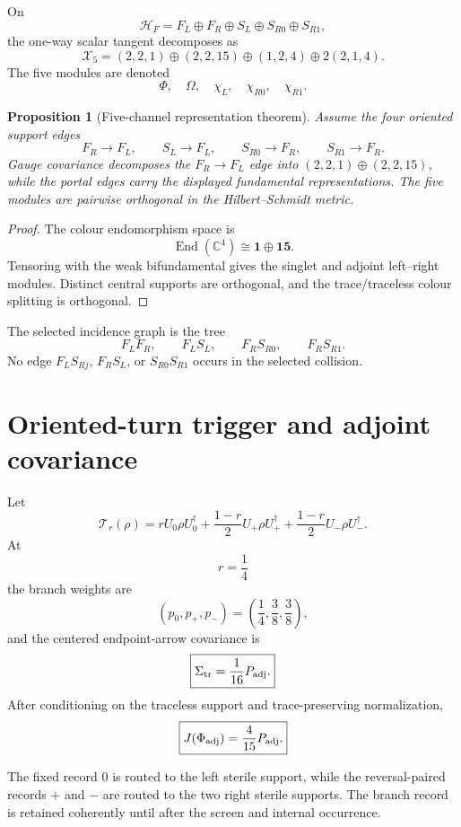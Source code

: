 \documentclass[11pt,oneside,openany]{book}
\numberwithin{equation}{chapter}
\newtheorem{proposition}[theorem]{Proposition}
\theoremstyle{definition}
\theoremstyle{remark}
\newcommand{\C}{\mathbb C}
\newcommand{\End}{\operatorname{End}}
\begin{document}
On
\[
 \mathcal H_F
 =
 F_L\oplus F_R\oplus S_L\oplus S_{R0}\oplus S_{R1},
\]
the one-way scalar tangent decomposes as
\[
 \boxed{
 \mathcal X_5
 =
 (2,2,1)
 \oplus
 (2,2,15)
 \oplus
 (1,2,4)
 \oplus
 2(2,1,4).}
\]
The five modules are denoted
\[
 \Phi,\quad\Omega,\quad\chi_L,\quad\chi_{R0},\quad\chi_{R1}.
\]

\begin{proposition}[Five-channel representation theorem]
\label{prop:five-channel-decomp}
Assume the four oriented support edges
\[
 F_R\to F_L,\qquad
 S_L\to F_L,\qquad
 S_{R0}\to F_R,\qquad
 S_{R1}\to F_R.
\]
Gauge covariance decomposes the \(F_R\to F_L\) edge into
\((2,2,1)\oplus(2,2,15)\), while the portal edges carry the displayed
fundamental representations.  The five modules are pairwise orthogonal in
the Hilbert--Schmidt metric.
\end{proposition}

\begin{proof}
The colour endomorphism space is
\[
 \End(\C^4)\cong\mathbf1\oplus\mathbf{15}.
\]
Tensoring with the weak bifundamental gives the singlet and adjoint
left--right modules.  Distinct central supports are orthogonal, and the
trace/traceless colour splitting is orthogonal.
\end{proof}

The selected incidence graph is the tree
\[
 \boxed{
 F_LF_R,\qquad
 F_LS_L,\qquad
 F_RS_{R0},\qquad
 F_RS_{R1}.}
 \label{eq:selected-five-tree}
\]
No edge \(F_LS_{Rj}\), \(F_RS_L\), or \(S_{R0}S_{R1}\) occurs in the selected
collision.

\section{Oriented-turn trigger and adjoint covariance}

Let
\[
 \mathcal T_r(\rho)
 =
 rU_0\rho U_0^\dagger
 +
 \frac{1-r}{2}U_+\rho U_+^\dagger
 +
 \frac{1-r}{2}U_-\rho U_-^\dagger.
\]
At
\[
 \boxed{r=\frac14}
\]
the branch weights are
\[
 \boxed{
 (p_0,p_+,p_-)
 =
 \left(\frac14,\frac38,\frac38\right),}
\]
and the centered endpoint-arrow covariance is
\[
 \boxed{
 \Sigma_{\rm tr}
 =
 \frac1{16}P_{\rm adj}.}
\]
After conditioning on the traceless support and trace-preserving
normalization,
\[
 \boxed{
 J(\Phi_{\rm adj})
 =
 \frac4{15}P_{\rm adj}.}
\]

The fixed record \(0\) is routed to the left sterile support, while the
reversal-paired records \(+\) and \(-\) are routed to the two right sterile
supports.  The branch record is retained coherently until after the screen
and internal occurrence.
\end{document}
